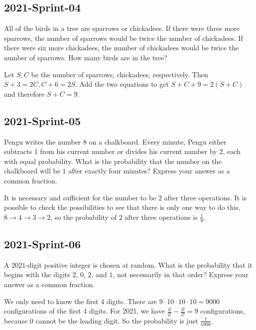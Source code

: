 \documentclass[12pt]{article}
\begin{document}
\subsection*{2021-Sprint-04}
All of the birds in a tree are sparrows or chickadees. If there were three more sparrows, the number of sparrows would be twice the number of chickadees. If there were six more chickadees, the number of chickadees would be twice the number of sparrows. How many birds are in the tree?
\begin{answer}
Let $S,C$ be the number of sparrows, chickadees, respectively. Then $S+3=2C, C+6=2S$. Add the two equations to get $S+C+9=2(S+C)$ and therefore $S+C=9$.
\end{answer}

\subsection*{2021-Sprint-05}
Pengu writes the number $8$ on a chalkboard. Every minute, Pengu either subtracts $1$ from his current number or divides his current number by $2$, each with equal probability. What is the probability that the number on the chalkboard will be $1$ after exactly four minutes? Express your answer as a common fraction.
\begin{answer}
It is necessary and sufficient for the number to be $2$ after three operations. It is possible to check the possibilities to see that there is only one way to do this, $8\rightarrow 4\rightarrow 3\rightarrow 2$, so the probability of $2$ after three operations is $\frac{1}{8}$.
\end{answer}

\subsection*{2021-Sprint-06}
A $2021$-digit positive integer is chosen at random. What is the probability that it begins with the digits $2$, $0$, $2$, and $1$, not necessarily in that order? Express your answer as a common fraction.
\begin{answer}
We only need to know the first 4 digits. There are $9 \cdot 10 \cdot 10 \cdot 10 = 9000$ configurations of the first 4 digits. For 2021, we have $\frac{4!}{2!} - \frac{3!}{2!} = 9$ configurations, because 0 cannot be the leading digit. So the probability is just $\frac{1}{1000}$.
\end{answer}
\end{document}
